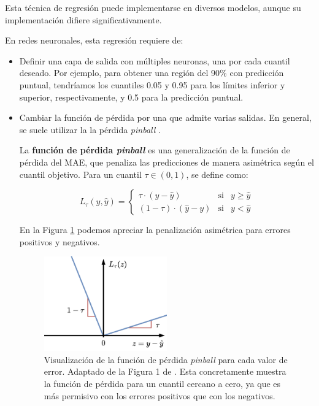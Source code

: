 Esta técnica de regresión puede implementarse en diversos modelos, aunque su implementación difiere 
significativamente. 

En redes neuronales, esta regresión requiere de:

\begin{itemize}

    \item Definir una capa de salida con múltiples neuronas, una por cada cuantil deseado. Por ejemplo, para 
    obtener una región del 90\% con predicción puntual, tendríamos los cuantiles 0.05 y 0.95 para los límites
    inferior y superior, respectivamente, y 0.5 para la predicción puntual. 

    \item Cambiar la función de pérdida por una que admite varias salidas. En general, se suele utilizar la 
    la pérdida \textit{pinball} \cite{steinwart2011}.

    La \textbf{función de pérdida \textit{pinball}} es una generalización de la función de pérdida del MAE,
    que penaliza las predicciones de manera asimétrica según el cuantil objetivo. Para un cuantil 
    $\tau \in \left( 0,1\right)$, se define como:

    $$
    L_\tau(y,\hat{y}) = \left\{
        \begin{array}{rcl}
            \tau \cdot (y-\hat{y}) & \mbox{si} & y \ge \hat{y}
            \\
            (1-\tau) \cdot (\hat{y}-y) & \mbox{si} & y < \hat{y}
        \end{array}
    \right.
    $$

    En la Figura \ref{fig:pinball_loss} podemos apreciar la penalización asimétrica para errores positivos y 
    negativos. 

    \begin{figure}[h]
        \centering
        \includegraphics[width=0.5\textwidth]{capitulos/cap_04/imagenes/pinball_loss.png}
        \caption[
            Visualización de la función de pérdida \textit{pinball} para cada valor de error.
        ]{
            Visualización de la función de pérdida \textit{pinball} para cada valor de error.
            Adaptado de la Figura 1 de \cite{romano2019}.
            Esta concretamente muestra la función de pérdida para un cuantil cercano a cero, 
            ya que es más permisivo con los errores positivos que con los negativos.
        } 
        \label{fig:pinball_loss}
    \end{figure}


\end{itemize}
